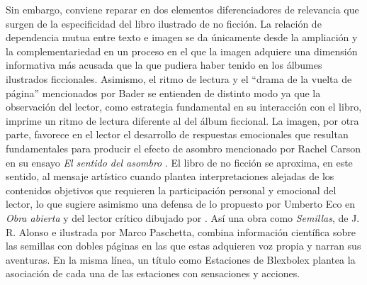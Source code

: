 \documentclass[spanish]{textolivre}
\begin{document}
Sin embargo, conviene reparar en dos elementos diferenciadores de relevancia que surgen de la especificidad del libro ilustrado de no ficción. La relación de dependencia mutua entre texto e imagen se da únicamente desde la ampliación y la complementariedad en un proceso en el que la imagen adquiere una dimensión informativa más acusada que la que pudiera haber tenido en los álbumes ilustrados ficcionales. Asimismo, el ritmo de lectura y el “drama de la vuelta de página” mencionados por Bader se entienden de distinto modo ya que la observación del lector, como estrategia fundamental en su interacción con el libro, imprime un ritmo de lectura diferente al del álbum ficcional. La imagen, por otra parte, favorece en el lector el desarrollo de respuestas emocionales \cite{nikolajeva_emotions_2018} que resultan fundamentales para producir el efecto de asombro mencionado por Rachel Carson en su ensayo \textit{El sentido del asombro} \cite{carson_sentido_2021}. El libro de no ficción se aproxima, en este sentido, al mensaje artístico cuando plantea interpretaciones alejadas de los contenidos objetivos que requieren la participación personal y emocional del lector, lo que sugiere asimismo una defensa de lo propuesto por Umberto Eco en \textit{Obra abierta} \cite{eco_obra_1993} y del lector crítico dibujado por \textcite{sanders_literature_2017}. Así una obra como \textit{Semillas}, de J. R. Alonso e ilustrada por Marco Paschetta, combina información científica sobre las semillas con dobles páginas en las que estas adquieren voz propia y narran sus aventuras. En la misma línea, un título como Estaciones de Blexbolex plantea la asociación de cada una de las estaciones con sensaciones y acciones.
\end{document}
